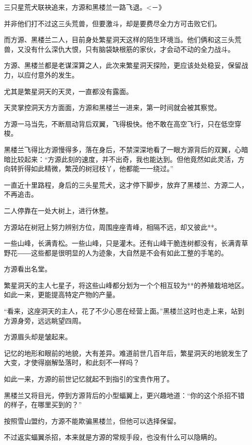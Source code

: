 
\begin{this_body}

三只星荒犬联袂追来，方源和黑楼兰一路飞退。<－》

并非他们打不过这三头荒兽，但要激斗，却是要费尽全力方可击败它们。

而方源、黑楼兰二人，目前身处繁星洞天这样的陌生环境当。他们俩和这三头荒兽，又没有什么深仇大恨，只有脑袋缺根筋的家伙，才会动不动的全力战斗。

方源、黑楼兰都是老谋深算之人，此次来繁星洞天探险，更应该处处稳妥，保留战力，以应付意外的发生。

尤其是繁星洞天的天灵，一直都没有露面。

天灵掌控洞天方方面面，方源和黑楼兰一进来，第一时间就会被其察觉。

方源一马当先，不断扇动背后双翼，飞得极快。他不敢在高空飞行，只在低空穿梭。

黑楼兰飞得比方源慢得多，落在身后，不禁深深地看了一眼方源背后的双翼，心暗暗比较起来：“方源此刻的速度，并不出奇，我也能达到。但他竟然如此灵活，方向转折得如此精微，繁茂的树冠枝丫，他都能一一绕过。”

一直近十里路程，身后的三头星荒犬，这才停下脚步，放弃了黑楼兰、方源二人，不再追击。

二人停靠在一处大树上，进行休整。

方源站在树冠上努力辨别方位，周围座座青峰，相隔不远，却又彼此**。

一些山峰，长满青松。一些山峰，只是灌木。还有山峰干脆连树都没有，长满青草野花――这些都是很明显的人为迹象，大自然是不会有如此工整的手笔的。

方源看出名堂。

繁星洞天的主人七星子，将这些山峰都分划为一个个相互较为**的养殖栽培地区。如此一来，更能提高特定产物的产量。

“看来，这座洞天的主人，花了不少心思在经营上面。”黑楼兰这时也走上来，站到方源身旁，远远眺望四周。

方源眉头却是皱起来。

记忆的地形和眼前的地貌，大有差异。难道前世几百年后，繁星洞天的地貌发生了大变，才使得崩解坠落时，和此刻不一样吗？

如此一来，方源的前世记忆就起不到指引的宝贵作用了。

黑楼兰又将目光，停到方源背后的小型蝠翼上，更兴趣地道：“你的这个杀招不错的样子，在哪里买到的？”

按照雪山盟约，方源不能欺骗黑楼兰，但他可以选择保留。

不过返实蝠翼杀招，本来就是方源的常规手段，也没有什么可以隐瞒的。


\end{this_body}
